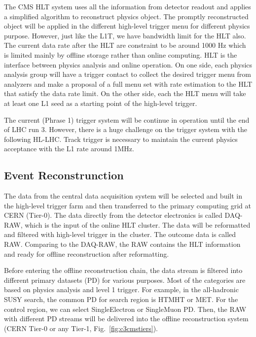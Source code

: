 The CMS HLT system uses all the information from detector readout and applies a simplified algorithm to reconstruct physics object. The promptly reconstructed object will be applied in the different high-level trigger menu for different physics purpose. However, just like the L1T, we have bandwidth limit for the HLT also. The current data rate after the HLT are constraint to be around 1000 Hz which is limited mainly by offline storage rather than online computing. HLT is the interface between physics analysis and online operation. On one side, each physics analysis group will have a trigger contact to collect the desired trigger menu from analyzers and make a proposal of a full menu set with rate estimation to the HLT that satisfy the data rate limit. On the other side, each the HLT menu will take at least one L1 seed as a starting point of the high-level trigger.

The current (Phrase 1) trigger system will be continue in operation until the end of LHC run 3. However, there is a huge challenge on the trigger system with the following HL-LHC. Track trigger is necessary to maintain the current physics acceptance with the L1 rate around 1MHz. 

\subsection{Event Reconstrunction}

The data from the central data acquisition system will be selected and built in the high-level trigger farm and then transferred to the primary computing grid at CERN (Tier-0). The data directly from the detector electronics is called DAQ-RAW, which is the input of the online HLT cluster. The data will be reformatted and filtered with high-level trigger in the cluster. The outcome data is called RAW. Comparing to the DAQ-RAW, the RAW contains the HLT information and ready for offline reconstruction after reformatting. 

Before entering the offline reconstruction chain, the data stream is filtered into different primary datasets (PD) for various purposes. Most of the categories are based on physics analysis and level 1 trigger. For example, in the all-hadronic SUSY search, the common PD for search region is HTMHT or MET. For the control region, we can select SingleElectron or SingleMuon PD. Then, the RAW with different PD streams will be delivered into the offline reconstruction system (CERN Tier-0 or any Tier-1, Fig.~\ref{fig:c3cmstiers}). 

